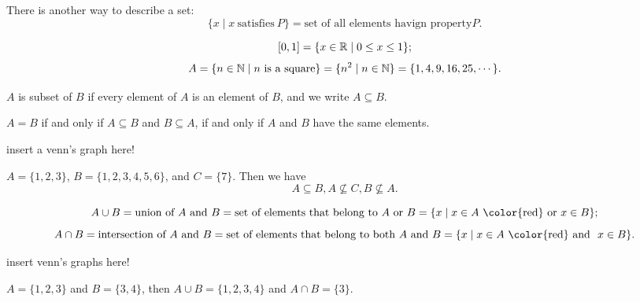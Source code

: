   There is another way to describe a set:
  \[
    \{x \mid x~ \text{satisfies}~ P\} = \text{set of all elements havign property}
    P.
  \]

  \begin{example}
    \[
      [0,1] = \{x \in\mathbb{R}\mid 0 \le x \le 1\};
    \]
    \[
      A = \{n\in \mathbb{N}\mid n~ \text{is a square}\} = \{n^2\mid n\in \mathbb{N}\} = \{1 ,4,
      9, 16, 25, \cdots\}.
    \]
  \end{example}

  \begin{definition}[Subsets]
    $A$ is subset of $B$ if every element of $A$ is an element of $B$, and we
    write $A \subseteq B$.
  \end{definition}

  \begin{remark}
    $A = B$ if and only if $A\subseteq B$ and $B\subseteq A$, if and only if $A$
    and $B$ have the same elements.
  \end{remark}

  {\color{red} insert a venn's graph here!} 

  \begin{example}
    $A = \{1, 2, 3\}$, $B= \{1, 2, 3, 4, 5, 6\}$, and $C = \{7\}$. Then we have
    \[
      A \subseteq B, A\nsubseteq C, B\nsubseteq A.
    \]
  \end{example}

  \begin{definition}
    \[
      A \cup B = \text{union of } A~\text{and}~B = \text{set of elements that
        belong to } A~\text{or}~B = \{x\mid x\in A~\text{{\color{red} or}}~x\in B\};
    \]
    \[
      A \cap B = \text{intersection of } A~\text{and}~B = \text{set of elements that
        belong to both } A~\text{and}~B = \{x\mid x\in A~\text{{\color{red} and} }~x\in B\}.
    \]
  \end{definition}

  {\color{red} insert venn's graphs here!} 

  \begin{example}
    $A = \{1, 2, 3\}$ and $B = \{3, 4\}$, then $A\cup B = \{1, 2, 3, 4\}$ and
    $A\cap B = \{3\}$.
  \end{example}
  
